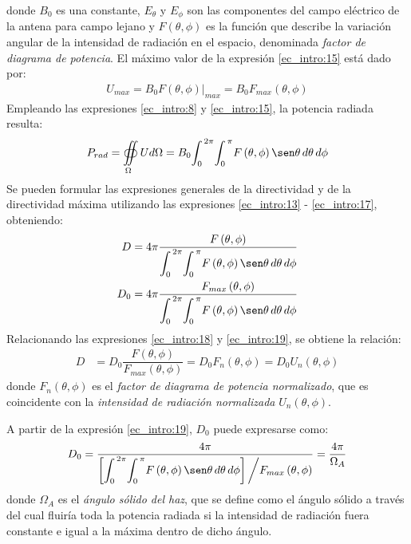donde $B_0$ es una constante, $E_{\theta}$ y $E_{\phi}$  son las componentes del campo eléctrico de la antena para campo lejano y $F\left(\theta,\phi\right)$ es la función que describe la variación angular de la intensidad de radiación en el espacio, denominada \emph{factor de diagrama de potencia}. El máximo valor de la expresión \eqref{ec_intro:15} está dado por:
\begin{align}
\left.U_{max} = B_0F\left(\theta,\phi\right)\right|_{max} = B_0F_{max}\left(\theta,\phi\right)
\label{ec_intro:16}
\end{align}
Empleando las expresiones \eqref{ec_intro:8} y \eqref{ec_intro:15}, la potencia radiada resulta:
\begin{align}
P_{rad} = \oiint\limits_{\Omega}Ud\Omega = B_0\!\int_0^{\,2\pi}\!\int_0^{\,\pi}\!F\left(\theta,\phi\right)\sen\theta\,d\theta\,d\phi
\label{ec_intro:17}
\end{align}
Se pueden formular las expresiones generales de la directividad y de la directividad máxima utilizando las expresiones \eqref{ec_intro:13} - \eqref{ec_intro:17}, obteniendo:
\begin{align}
D &= 4\pi\dfrac{F\left(\theta,\phi\right)}{\displaystyle\int_0^{\,2\pi}\!\int_0^{\,\pi}\!F\left(\theta,\phi\right)\sen\theta\,d\theta\,d\phi}
\label{ec_intro:18}\\
D_0 &= 4\pi\dfrac{F_{max}\left(\theta,\phi\right)}{\displaystyle\int_0^{\,2\pi}\!\int_0^{\,\pi}\!F\left(\theta,\phi\right)\sen\theta\,d\theta\,d\phi}
\label{ec_intro:19}
\end{align}
Relacionando las expresiones \eqref{ec_intro:18} y \eqref{ec_intro:19}, se obtiene la relación:
\begin{align}
D &= D_0\dfrac{F\left(\theta,\phi\right)}{F_{max}\left(\theta,\phi\right)} = D_0F_n\left(\theta,\phi\right) = D_0U_n\left(\theta,\phi\right)
\label{ec_intro:20}
\end{align}
donde $F_n\left(\theta,\phi\right)$ es el \emph{factor de diagrama de potencia normalizado}, que es coincidente con la \emph{intensidad de radiación normalizada} $U_n\left(\theta,\phi\right)$.

A partir de la expresión \eqref{ec_intro:19}, $D_0$ puede expresarse como:
\begin{align}
D_0 = \dfrac{4\pi}{\left[\displaystyle\int_0^{\,2\pi}\!\int_0^{\,\pi}\!F\left(\theta,\phi\right)\sen\theta\,d\theta\,d\phi\right]\bigg{/}F_{max}\left(\theta,\phi\right)} = \frac{4\pi}{\Omega_A}
\label{ec_intro:21}
\end{align}
donde $\Omega_A$ es el \emph{ángulo sólido del haz}, que se define como el ángulo sólido a través del cual fluiría toda la potencia radiada si la intensidad de radiación fuera constante e igual a la máxima dentro de dicho ángulo.

